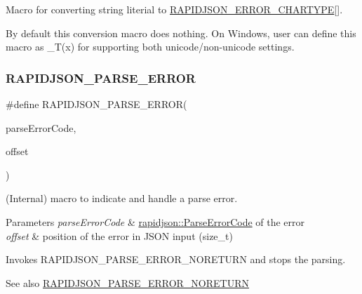 Macro for converting string literial to \hyperlink{a00635_ga7e4636fd48d0148f102b8a13f0539d8c}{R\+A\+P\+I\+D\+J\+S\+O\+N\+\_\+\+E\+R\+R\+O\+R\+\_\+\+C\+H\+A\+R\+T\+Y\+PE}\mbox{[}\mbox{]}. 

By default this conversion macro does nothing. On Windows, user can define this macro as {\ttfamily \+\_\+\+T(x)} for supporting both unicode/non-\/unicode settings. \mbox{\label{a00635_gae3689840fa6e89a241313f33b602f865}} 
\subsubsection{\texorpdfstring{R\+A\+P\+I\+D\+J\+S\+O\+N\+\_\+\+P\+A\+R\+S\+E\+\_\+\+E\+R\+R\+OR}{RAPIDJSON\_PARSE\_ERROR}}
{\footnotesize\ttfamily \#define R\+A\+P\+I\+D\+J\+S\+O\+N\+\_\+\+P\+A\+R\+S\+E\+\_\+\+E\+R\+R\+OR(\begin{DoxyParamCaption}\item[{}]{parse\+Error\+Code,  }\item[{}]{offset }\end{DoxyParamCaption})}



(Internal) macro to indicate and handle a parse error. 


\begin{DoxyParams}{Parameters}
{\em parse\+Error\+Code} & \hyperlink{a00635_ga8d4b32dfc45840bca189ade2bbcb6ba7}{rapidjson\+::\+Parse\+Error\+Code} of the error \\
\hline
{\em offset} & position of the error in J\+S\+ON input ({\ttfamily size\+\_\+t})\\
\hline
\end{DoxyParams}
Invokes R\+A\+P\+I\+D\+J\+S\+O\+N\+\_\+\+P\+A\+R\+S\+E\+\_\+\+E\+R\+R\+O\+R\+\_\+\+N\+O\+R\+E\+T\+U\+RN and stops the parsing.

\begin{DoxySeeAlso}{See also}
\hyperlink{a00635_ga7f8c4265b2edda78568ae3338aaf1461}{R\+A\+P\+I\+D\+J\+S\+O\+N\+\_\+\+P\+A\+R\+S\+E\+\_\+\+E\+R\+R\+O\+R\+\_\+\+N\+O\+R\+E\+T\+U\+RN} 
\end{DoxySeeAlso}
\mbox{\label{a00635_ga7f8c4265b2edda78568ae3338aaf1461}} 
